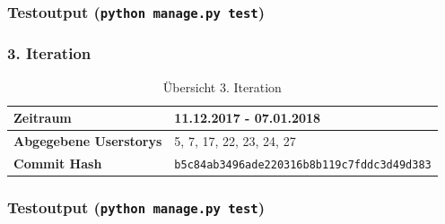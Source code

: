 \subsubsection{Testoutput (\texttt{python manage.py test})}


\subsubsection{3. Iteration}
\begin{table}[H]
\begin{center}
	\begin{tabular}{| l | l |}
		\hline
		\textbf{Zeitraum} & 11.12.2017 - 07.01.2018\\\hline
		\textbf{Abgegebene Userstorys} & 5, 7, 17, 22, 23, 24, 27\\\hline
		\textbf{Commit Hash} & \texttt{b5c84ab3496ade220316b8b119c7fddc3d49d383} \\\hline
	\end{tabular}
	\caption{Übersicht 3. Iteration}
\end{center}
\end{table}
\subsubsection{Testoutput (\texttt{python manage.py test})}

